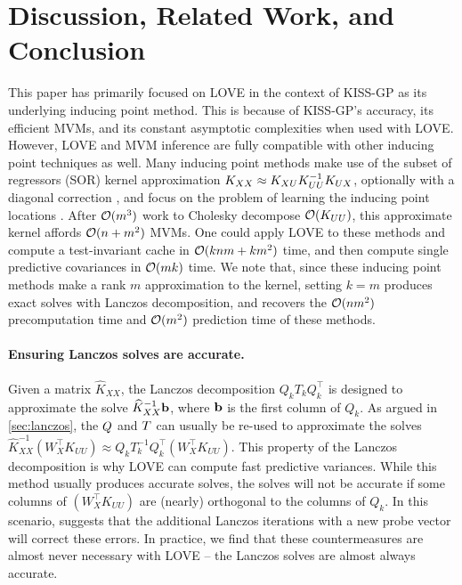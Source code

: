 \section{Discussion, Related Work, and Conclusion}
\label{sec:love_discussion}

This paper has primarily focused on LOVE{} in the context of KISS-GP as its underlying inducing point method.
This is because of KISS-GP's accuracy, its efficient MVMs, and its constant asymptotic complexities when used with LOVE{}.
However, LOVE and MVM inference are fully compatible with other inducing point techniques as well. Many inducing point methods make use of the subset of regressors (SOR) kernel approximation $K_{XX} \approx
K_{XU}K_{UU}^{-1}K_{UX}$, optionally with a diagonal correction \cite{snelson2006sparse}, and focus on the problem of learning the
inducing point locations \cite{quinonero2005unifying,titsias2009variational}. After $\bigo{m^{3}}$ work to Cholesky decompose
$\bigo{\bK_{UU}}$, this approximate kernel affords $\bigo{n + m^{2}}$ MVMs. One could apply LOVE to these methods and
compute a test-invariant cache in $\bigo{knm+km^{2}}$ time, and then compute single predictive covariances in $\bigo{mk}$ time.
We note that, since these inducing point methods make a rank $m$ approximation to the kernel, setting $k\!=\!m$ produces exact solves with Lanczos decomposition, and recovers the $\bigo{nm^{2}}$ precomputation time and $\bigo{m^2}$ prediction time of these methods.

\paragraph{Ensuring Lanczos solves are accurate.}
Given a matrix $\widehat K_{XX}$, the Lanczos decomposition $Q_k T_k Q_k^\top$ is designed to approximate the solve $\widehat K_{XX}^{-1} \mathbf{b}$, where $\mathbf{b}$ is the first column of $Q_k$.
As argued in \cref{sec:lanczos}, the $Q$ and $T$ can usually be re-used to approximate the solves $\widehat K_{XX}^{-1} (W_X^\top K_{UU}) \approx Q_k T_k^{-1} Q_k^\top (W_X^\top K_{UU})$.
This property of the Lanczos decomposition is why LOVE{} can compute fast predictive variances.
While this method usually produces accurate solves, the solves will not be accurate if some columns of $(W^\top_X K_{UU})$ are (nearly) orthogonal to the columns of $Q_k$.
In this scenario, \citet{saad1987lanczos} suggests that the additional Lanczos iterations with a new probe vector will correct these errors.
In practice, we find that these countermeasures are almost never necessary with LOVE{} -- the Lanczos solves are almost always accurate.


